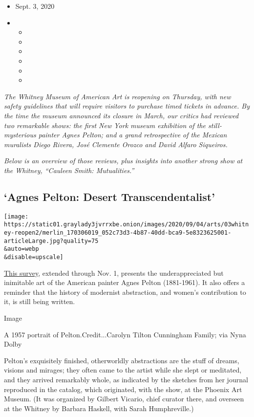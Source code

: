 \begin{itemize}
\item
  Sept. 3, 2020
\item
  \begin{itemize}
  \item
  \item
  \item
  \item
  \item
  \item
  \end{itemize}
\end{itemize}

\emph{The Whitney Museum of American Art is reopening on Thursday, with
new safety guidelines that will require visitors to purchase timed
tickets in advance. By the time the museum announced its closure in
March, our critics had reviewed two remarkable shows: the first New York
museum exhibition of the still-mysterious painter Agnes Pelton; and a
grand retrospective of the Mexican muralists Diego Rivera, José Clemente
Orozco and David Alfaro Siqueiros.}

\emph{Below is an overview of those reviews, plus insights into another
strong show at the Whitney, ``Cauleen Smith: Mutualities.''}

\hypertarget{agnes-pelton-desert-transcendentalist}{%
\subsection{`Agnes Pelton: Desert
Transcendentalist'}\label{agnes-pelton-desert-transcendentalist}}

\texttt{[image: https://static01.graylady3jvrrxbe.onion/images/2020/09/04/arts/03whitney-reopen2/merlin\_170306019\_052c73d3-4b87-40dd-bca9-5e8323625001-articleLarge.jpg?quality=75\\\&auto=webp\\\&disable=upscale]}

\href{https://www.nytimes3xbfgragh.onion/2020/03/12/arts/design/agnes-pelton-review-whitney-museum.html}{This
survey}, extended through Nov. 1, presents the underappreciated but
inimitable art of the American painter Agnes Pelton (1881-1961). It also
offers a reminder that the history of modernist abstraction, and women's
contribution to it, is still being written.

Image

A 1957 portrait of Pelton.Credit...Carolyn Tilton Cunningham Family; via
Nyna Dolby

Pelton's exquisitely finished, otherworldly abstractions are the stuff
of dreams, visions and mirages; they often came to the artist while she
slept or meditated, and they arrived remarkably whole, as indicated by
the sketches from her journal reproduced in the catalog, which
originated, with the show, at the Phoenix Art Museum. (It was organized
by Gilbert Vicario, chief curator there, and overseen at the Whitney by
Barbara Haskell, with Sarah Humphreville.)

